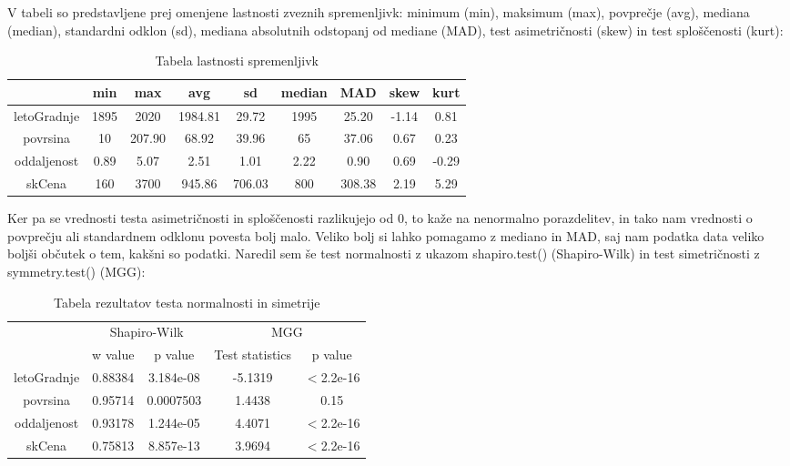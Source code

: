 \documentclass[a4paper, 12pt]{article}
\begin{document}
V tabeli so predstavljene prej omenjene lastnosti zveznih spremenljivk:
minimum (min), maksimum (max), povprečje (avg), mediana (median),
standardni odklon (sd), mediana absolutnih odstopanj od mediane (MAD), test
asimetričnosti (skew) in test sploščenosti (kurt):
\begin{table}[H]
\begin{center}
\caption{Tabela lastnosti spremenljivk}
\label{table:2}
\begin{tabular}{ c|cccccccc }
	& min & max & avg & sd & median & MAD & skew & kurt \\
	\hline
	letoGradnje & 1895 & 2020 & 1984.81 & 29.72 & 1995 & 25.20 & -1.14 & 0.81 \\
	povrsina & 10 & 207.90 & 68.92 & 39.96 & 65 & 37.06 & 0.67 & 0.23 \\
	oddaljenost & 0.89 & 5.07 & 2.51 & 1.01 & 2.22 & 0.90 & 0.69 & -0.29 \\
	skCena & 160 & 3700 & 945.86 & 706.03 & 800 & 308.38 & 2.19 & 5.29 \\
\end{tabular}
\end{center}
\end{table}

Ker pa se vrednosti testa asimetričnosti in sploščenosti razlikujejo od $ 0 $,
to kaže na nenormalno porazdelitev, in tako nam vrednosti o povprečju ali
standardnem odklonu povesta bolj malo. Veliko bolj si lahko pomagamo z mediano
in MAD, saj nam podatka data veliko boljši občutek o tem, kakšni so podatki.
Naredil sem še test normalnosti z ukazom {\sf shapiro.test()} (Shapiro-Wilk)
in test simetričnosti z {\sf symmetry.test()} (MGG):

\begin{table}[H]
\begin{center}
\caption{Tabela rezultatov testa normalnosti in simetrije}
\label{table:3}
\begin{tabular}{ c|cc|cc }
	& \multicolumn{2}{c}{Shapiro-Wilk} & \multicolumn{2}{c}{MGG} \\
	& w value & p value & Test statistics & p value \\
	\hline
	letoGradnje &  0.88384 & 3.184e-08 & -5.1319 & $<$2.2e-16 \\
	povrsina & 0.95714 & 0.0007503 & 1.4438 & 0.15 \\
	oddaljenost & 0.93178 & 1.244e-05 & 4.4071 & $<$2.2e-16 \\
	skCena & 0.75813 & 8.857e-13 & 3.9694 & $<$2.2e-16 \\
\end{tabular}
\end{center}
\end{table}
\end{document}

